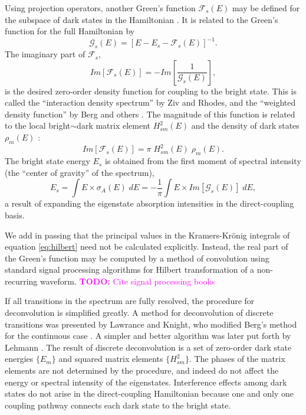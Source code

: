 \documentclass[12pt]{mitthesis}
\newcommand{\TODO} [1]{\textcolor{magenta}{\textbf{TODO:} #1}}
\begin{document}
Using projection operators, another Green's function
$\mathcal{F}_s(E)$ may be defined for the subspace of dark states in
the Hamiltonian \cite{ziv76, cable80}.  It is related to the Green's
function for the full Hamiltonian by
\begin{equation}
  \label{eq:green-subspace}
  \mathcal{G}_s(E) = [E - E_s - \mathcal{F}_s(E)]^{-1}.
\end{equation}
The imaginary part of $\mathcal{F}_s$,
\begin{equation}
  \label{eq:idf}
  Im[\mathcal{F}_s(E)] = - Im \left [
    \frac{1}{\mathcal{G}_s(E)}
  \right ], 
\end{equation}
is the desired zero-order density function for coupling to the bright
state.  This is called the ``interaction density spectrum'' by Ziv and
Rhodes, and the ``weighted density function'' by Berg and others
\cite{ziv76, berg76}.  The magnitude of this function is related to
the local bright$\sim$dark matrix element $H_{sm}^2(E)$ and the
density of dark states $\rho_m(E)$ \cite{berg76}:
\begin{equation}
  Im[\mathcal{F}_s(E)] = \pi \; H_{sm}^2(E) \; \rho_m(E).
\end{equation}
The bright state energy $E_s$ is obtained from the first moment of
spectral intensity (the ``center of gravity'' of the spectrum),
\begin{equation}
  \label{eq:bse-continuous}
  E_s = \int E \times \sigma_A (E) \; dE
  = - \frac{1}{\pi} \int E \times Im[\mathcal{G}_s(E)] \; dE,
\end{equation}
a result of expanding the eigenstate absorption intensities in the
direct-coupling basis.

We add in passing that the principal values in the Kramers-Kr\"{o}nig
integrals of equation \ref{eq:hilbert} need not be calculated
explicitly.  Instead, the real part of the Green's function may be
computed by a method of convolution using standard signal processing
algorithms for Hilbert transformation of a non-recurring
waveform. \TODO{Cite signal processing books}

If all transitions in the spectrum are fully resolved, the procedure
for deconvolution is simplified greatly.  A method for deconvolution
of discrete transitions was presented by Lawrance and Knight, who
modified Berg's method for the continuous case \cite{lawrance85,
  berg76}.  A simpler and better algorithm was later put forth by
Lehmann \cite{lehmann91}.  The result of discrete deconvolution is a
set of zero-order dark state energies $\lbrace E_m \rbrace$ and
squared matrix elements $\lbrace H_{sm}^2 \rbrace$.  The phases of the
matrix elements are not determined by the procedure, and indeed do not
affect the energy or spectral intensity of the eigenstates.
Interference effects among dark states do not arise in the
direct-coupling Hamiltonian because one and only one coupling pathway
connects each dark state to the bright state.
\end{document}
